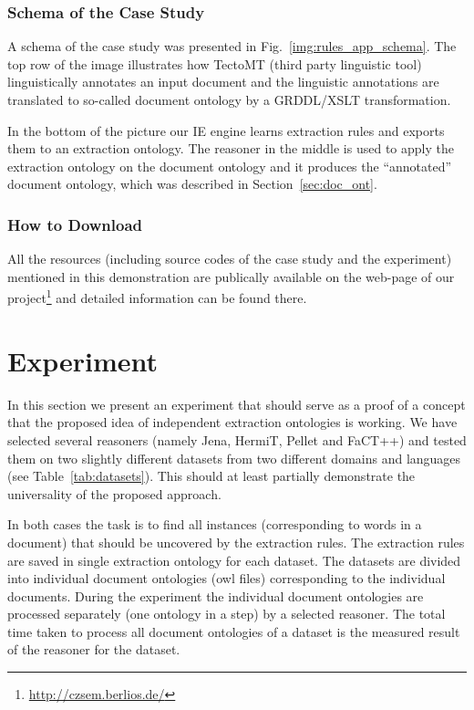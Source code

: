 \subsubsection{Schema of the Case Study}


A schema of the case study was presented in Fig.~\ref{img:rules_app_schema}.  
The top row of the image illustrates how TectoMT (third party linguistic tool) linguistically annotates an input document and the linguistic annotations are translated to so-called document ontology by a GRDDL/XSLT transformation.

In the bottom of the picture our IE engine learns extraction rules and exports them to an extraction ontology. The reasoner in the middle is used to apply the extraction ontology on the document ontology and it produces the ``annotated'' document ontology, which was described in Section~\ref{sec:doc_ont}.




\subsubsection{How to Download}
All the resources (including source codes of the case study and the experiment) mentioned in this demonstration are publically available on the web-page of our project\footnote{\url{http://czsem.berlios.de/}} and detailed information can be found there.


\section{Experiment} \label{sec:experiment}


In this section we present an experiment that should serve as a proof of a concept that the proposed idea of independent extraction ontologies is working. We have selected several reasoners (namely Jena, HermiT, Pellet and FaCT++) and tested them on two slightly different datasets from two different domains and languages (see Table~\ref{tab:datasets}). This should at least partially demonstrate the universality of the proposed approach.

In both cases the task is to find all instances (corresponding to words in a document) that should be uncovered by the extraction rules. The extraction rules are saved in single extraction ontology for each dataset. The datasets are divided into individual document ontologies (owl files) corresponding to the individual documents. During the experiment the individual document ontologies are processed separately (one ontology in a step) by a selected reasoner. The total time taken to process all document ontologies of a dataset is the measured result of the reasoner for the dataset.

